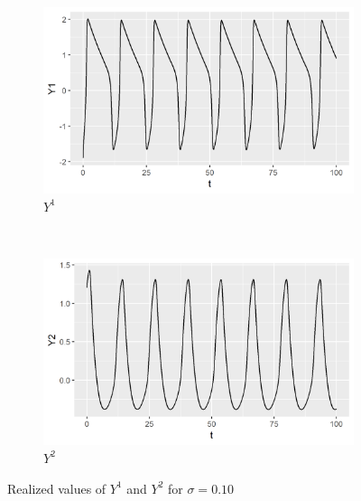 \documentclass[a4paper]{article}
\begin{document}
\clearpage
\begin{figure}
    \centering
    \begin{subfigure}[b]{0.45\textwidth}
        \includegraphics[width=\textwidth]{part1a-sigma1-Y1.png}
        \caption{$Y^1$}
    \end{subfigure}
    ~
    \begin{subfigure}[b]{0.45\textwidth}
        \includegraphics[width=\textwidth]{part1a-sigma1-Y2.png}
        \caption{$Y^2$}
    \end{subfigure}
    \caption{Realized values of $Y^1$ and $Y^2$ for $\sigma = 0.10$}\label{fig:part1a-sigma1}
\end{figure}
\end{document}
